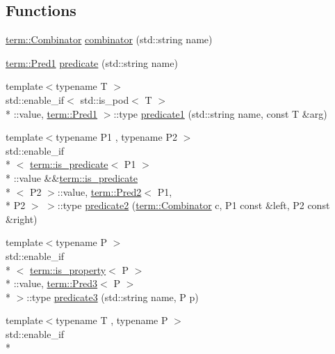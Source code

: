 \subsection*{Functions}
\begin{DoxyCompactItemize}
\item 
\hyperlink{structpfq__lang_1_1term_1_1Combinator}{term\-::\-Combinator} \hyperlink{namespacepfq__lang_a35f3de0a6684c64d0465aa3f263fa8a6}{combinator} (std\-::string name)
\item 
\hyperlink{structpfq__lang_1_1term_1_1Pred1}{term\-::\-Pred1} \hyperlink{namespacepfq__lang_abd58b2244ff8b0775a3b5865bc128872}{predicate} (std\-::string name)
\item 
{\footnotesize template$<$typename T $>$ }\\std\-::enable\-\_\-if$<$ std\-::is\-\_\-pod$<$ T $>$\\*
\-::value, \hyperlink{structpfq__lang_1_1term_1_1Pred1}{term\-::\-Pred1} $>$\-::type \hyperlink{namespacepfq__lang_ae23a03cee94b5ddfde4a8d2e5c521f0e}{predicate1} (std\-::string name, const T \&arg)
\item 
{\footnotesize template$<$typename P1 , typename P2 $>$ }\\std\-::enable\-\_\-if\\*
$<$ \hyperlink{structpfq__lang_1_1term_1_1is__predicate}{term\-::is\-\_\-predicate}$<$ P1 $>$\\*
\-::value \&\&\hyperlink{structpfq__lang_1_1term_1_1is__predicate}{term\-::is\-\_\-predicate}\\*
$<$ P2 $>$\-::value, \hyperlink{structpfq__lang_1_1term_1_1Pred2}{term\-::\-Pred2}$<$ P1, \\*
P2 $>$ $>$\-::type \hyperlink{namespacepfq__lang_a89ea436faf8b7f13512e07efbce83b41}{predicate2} (\hyperlink{structpfq__lang_1_1term_1_1Combinator}{term\-::\-Combinator} c, P1 const \&left, P2 const \&right)
\item 
{\footnotesize template$<$typename P $>$ }\\std\-::enable\-\_\-if\\*
$<$ \hyperlink{structpfq__lang_1_1term_1_1is__property}{term\-::is\-\_\-property}$<$ P $>$\\*
\-::value, \hyperlink{structpfq__lang_1_1term_1_1Pred3}{term\-::\-Pred3}$<$ P $>$\\*
 $>$\-::type \hyperlink{namespacepfq__lang_a863e349ba4942bf8a01b61d91859164a}{predicate3} (std\-::string name, P p)
\item 
{\footnotesize template$<$typename T , typename P $>$ }\\std\-::enable\-\_\-if\\*

\end{DoxyCompactItemize}
